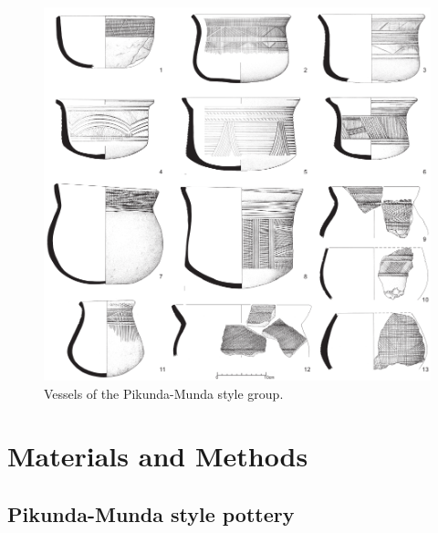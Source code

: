 \documentclass[smallextended,natbib]{svjour3}       %
\begin{document}
\begin{figure}[!tb]
	\includegraphics[width=\textwidth]{Fig_PKMvessels.pdf}
	\caption{Vessels of the Pikunda-Munda style group.}
	\label{fig:pkmtypes}
\end{figure}

\section{Materials and Methods}\label{materials}

\subsection{Pikunda-Munda style pottery}
\end{document}
